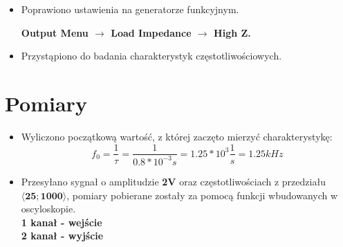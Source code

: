 \begin{itemize}
    \item Poprawiono ustawienia na generatorze funkcyjnym.
        \begin{center}
            \textbf{Output Menu $\xrightarrow{}$ Load Impedance $\xrightarrow{}$ High Z.}
        \end{center}
    \item Przystąpiono do badania charakterystyk częstotliwościowych.
\end{itemize}

\newpage

\section{Pomiary}

\begin{itemize}
    \item Wyliczono początkową wartość, z której zaczęto mierzyć charakterystykę:
        \begin{equation}
            f_0 = \frac{1}{\tau} = \frac{1}{0.8 * 10^{-3}s} = 1.25 * 10^3 \frac{1}{s} = 1.25kHz
        \end{equation}
    \item Przesyłano sygnał o amplitudzie \textbf{2V} oraz częstotliwościach z przedziału $\langle\textbf{25};\textbf{1000}\rangle$, pomiary pobierane zostały za pomocą funkcji wbudowanych w oscyloskopie. \\
    \textbf{1 kanał - wejście} \\
    \textbf{2 kanał - wyjście}
\end{itemize}

